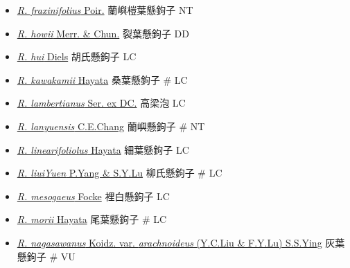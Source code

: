 \begin{itemize}
\begin{itemize}
        \item[] \href{http://www.theplantlist.org/tpl1.1/search?q=Rubus+fraxinifolius}{\textit{R. fraxinifolius} Poir.}   蘭嶼榿葉懸鉤子   NT
        \item[] \href{http://www.theplantlist.org/tpl1.1/search?q=Rubus+howii}{\textit{R. howii} Merr. \& Chun.}   裂葉懸鉤子   DD
        \item[] \href{http://www.theplantlist.org/tpl1.1/search?q=Rubus+hui}{\textit{R. hui} Diels}   胡氏懸鉤子   LC
        \item[] \href{http://www.theplantlist.org/tpl1.1/search?q=Rubus+kawakamii}{\textit{R. kawakamii} Hayata}   桑葉懸鉤子  \# LC
        \item[] \href{http://www.theplantlist.org/tpl1.1/search?q=Rubus+lambertianus}{\textit{R. lambertianus} Ser. ex DC.}   高梁泡   LC
        \item[] \href{http://www.theplantlist.org/tpl1.1/search?q=Rubus+lanyuensis}{\textit{R. lanyuensis} C.E.Chang}   蘭嶼懸鉤子  \# NT
        \item[] \href{http://www.theplantlist.org/tpl1.1/search?q=Rubus+linearifoliolus}{\textit{R. linearifoliolus} Hayata}   細葉懸鉤子   LC
        \item[] \href{http://www.theplantlist.org/tpl1.1/search?q=Rubus+liuiYuen}{\textit{R. liuiYuen} P.Yang \& S.Y.Lu}   柳氏懸鉤子  \# LC
        \item[] \href{http://www.theplantlist.org/tpl1.1/search?q=Rubus+mesogaeus}{\textit{R. mesogaeus} Focke}   裡白懸鉤子   LC
        \item[] \href{http://www.theplantlist.org/tpl1.1/search?q=Rubus+morii}{\textit{R. morii} Hayata}   尾葉懸鉤子  \# LC
        \item[] \href{http://www.theplantlist.org/tpl1.1/search?q=Rubus+nagasawanus+var.+arachnoideus}{\textit{R. nagasawanus} Koidz. var. \textit{arachnoideus} (Y.C.Liu \& F.Y.Lu) S.S.Ying}   灰葉懸鉤子  \# VU

\end{itemize}
\end{itemize}
